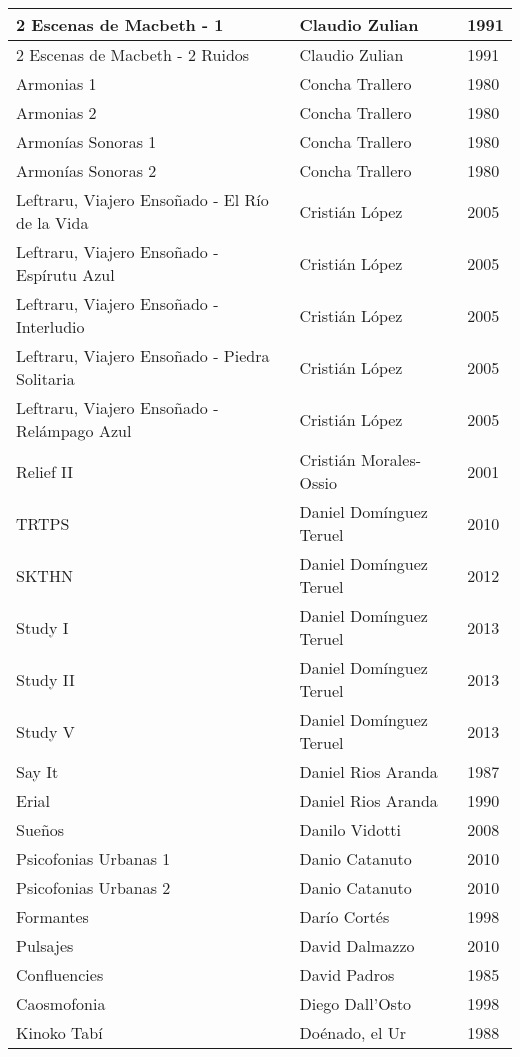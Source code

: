 \begin{center}
\begin{longtable}{ p{}  p{}  p{} }
2 Escenas de Macbeth - 1 & Claudio Zulian & 1991 \\ \midrule 
2 Escenas de Macbeth - 2 Ruidos & Claudio Zulian & 1991 \\ \midrule 
Armonias 1 & Concha Trallero & 1980 \\ \midrule 
Armonias 2 & Concha Trallero & 1980 \\ \midrule 
Armonías Sonoras 1 & Concha Trallero & 1980 \\ \midrule 
Armonías Sonoras 2 & Concha Trallero & 1980 \\ \midrule 
Leftraru, Viajero Ensoñado - El Río de la Vida & Cristián López & 2005 \\ \midrule 
Leftraru, Viajero Ensoñado - Espírutu Azul & Cristián López & 2005 \\ \midrule 
Leftraru, Viajero Ensoñado - Interludio & Cristián López & 2005 \\ \midrule 
Leftraru, Viajero Ensoñado - Piedra Solitaria & Cristián López & 2005 \\ \midrule 
Leftraru, Viajero Ensoñado - Relámpago Azul & Cristián López & 2005 \\ \midrule 
Relief II & Cristián Morales-Ossio & 2001 \\ \midrule 
TRTPS & Daniel Domínguez Teruel & 2010 \\ \midrule 
SKTHN & Daniel Domínguez Teruel & 2012 \\ \midrule 
Study I & Daniel Domínguez Teruel & 2013 \\ \midrule 
Study II & Daniel Domínguez Teruel & 2013 \\ \midrule 
Study V & Daniel Domínguez Teruel & 2013 \\ \midrule 
Say It & Daniel Rios Aranda & 1987 \\ \midrule 
Erial & Daniel Rios Aranda & 1990 \\ \midrule 
Sueños & Danilo Vidotti & 2008 \\ \midrule 
Psicofonias Urbanas 1 & Danio Catanuto & 2010 \\ \midrule 
Psicofonias Urbanas 2 & Danio Catanuto & 2010 \\ \midrule 
Formantes & Darío Cortés & 1998 \\ \midrule 
Pulsajes & David Dalmazzo & 2010 \\ \midrule 
Confluencies & David Padros & 1985 \\ \midrule 
Caosmofonia & Diego Dall'Osto & 1998 \\ \midrule 
Kinoko Tabí & Doénado, el Ur & 1988 \\ \midrule 

\end{longtable}
\end{center}
